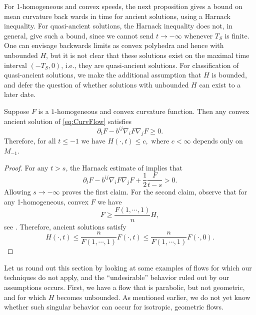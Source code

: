 \documentclass{amsart}
\begin{document}
For 1-homogeneous and convex speeds, the next proposition gives a bound on mean curvature back wards in time for ancient solutions, using a Harnack inequality. For quasi-ancient solutions, the Harnack inequality does not, in general, give such a bound, since we cannot send \(t \to -\infty\) whenever \(T_S\) is finite. One can envisage backwards limits as convex polyhedra and hence with unbounded \(H\), but it is not clear that these solutions exist on the maximal time interval \((-T_S, 0)\), i.e., they are quasi-ancient solutions. For classification of quasi-ancient solutions, we make the additional assumption that \(H\) is bounded, and defer the question of whether solutions with unbounded \(H\) can exist to a later date.

\begin{prop}
\label{cor:boundedH}
Suppose $F$ is a \(1\)-homogeneous and convex curvature function. Then any convex ancient solution of \eqref{eq:CurvFlow} satisfies
\[\partial_t F-b^{ij}\nabla_i F \nabla_j F \geq 0.\]
Therefore, for all $t\le -1$ we have
$H(\cdot,t)\leq c,$
where $c<\infty$ depends only on $M_{-1}.$
\end{prop}
\begin{proof}
For any $t>s$, the  Harnack estimate of \cite[Theorem 1]{bryan2015harnack} implies that
$$\partial_t F-b^{ij}\nabla_i F\nabla_j F+\frac{1}{2}\frac{F}{t-s}>0.$$
Allowing $s\to-\infty$ proves the first claim. For the second claim, observe that for any 1-homogeneous, convex $F$ we have \[F\ge \frac{F(1,\cdots,1)}{n}H,\]
see \cite[Lemma~2.2.20]{Gerhardt:/2006}. Therefore, ancient solutions satisfy
\[H(\cdot,t)\leq \frac{n}{F(1,\cdots,1)}F(\cdot,t)\leq \frac{n}{F(1,\cdots,1)}F(\cdot,0). \]
\end{proof}
Let us round out this section by looking at some examples of flows for which our techniques do not apply, and the ``undesirable'' behavior ruled out by our assumptions occurs. First, we have a flow that is parabolic, but not geometric, and for which \(H\) becomes unbounded. As mentioned earlier, we do not yet know whether such singular behavior can occur for isotropic, geometric flows.
\end{document}
